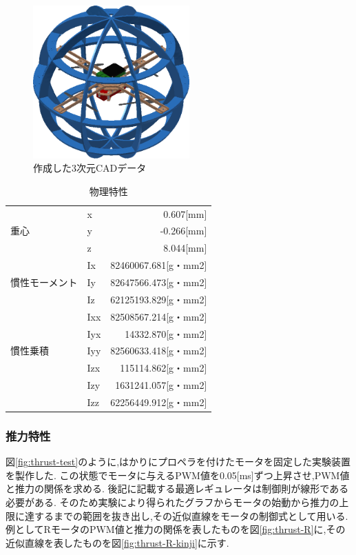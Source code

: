 \documentclass[12pt,oneside]{sotsuken_paper}
\begin{document}
\begin{figure}[htbp]
	\begin{center}
		\includegraphics[width=60mm]{image/3DCAD.jpg}
		\caption{作成した3次元CADデータ}
		\label{fig:3DCAD}
	\end{center}
\end{figure}

\begin{table}[htbp]
	\begin{center}
		\caption{物理特性}
		\begin{tabular}{|l|l|r|} \hline
			 & x & 0.607[mm] \\
			重心 & y & -0.266[mm] \\
			 & z & 8.044[mm]　\\ \hline
			　& Ix & 82460067.681[g・mm2] \\
			慣性モーメント & Iy & 82647566.473[g・mm2] \\
			 & Iz & 62125193.829[g・mm2] \\ \hline
			 & Ixx & 82508567.214[g・mm2] \\
			 & Iyx & 14332.870[g・mm2] \\
			慣性乗積 & Iyy & 82560633.418[g・mm2] \\
			 & Izx & 115114.862[g・mm2] \\
			 & Izy & 1631241.057[g・mm2] \\
			 & Izz & 62256449.912[g・mm2] \\ \hline
		\end{tabular}
		\label{table:phy}
	\end{center}
\end{table}

\subsubsection{推力特性}
図\ref{fig:thrust-test}のように,はかりにプロペラを付けたモータを固定した実験装置を製作した.
この状態でモータに与えるPWM値を0.05[ms]ずつ上昇させ,PWM値と推力の関係を求める.
後記に記載する最適レギュレータは制御則が線形である必要がある.
そのため実験により得られたグラフからモータの始動から推力の上限に達するまでの範囲を抜き出し,その近似直線をモータの制御式として用いる.
例としてRモータのPWM値と推力の関係を表したものを図\ref{fig:thrust-R}に,その近似直線を表したものを図\ref{fig:thrust-R-kinji}に示す.
\end{document}
